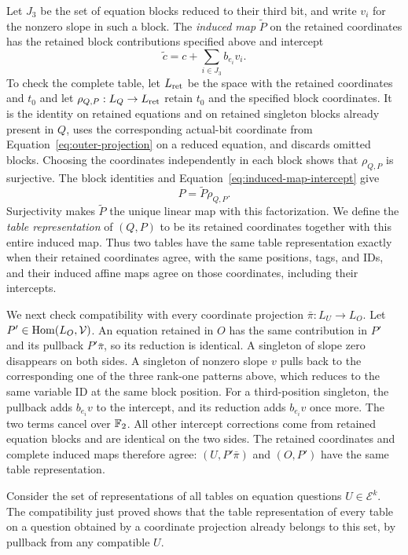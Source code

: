 Let \(J_3\) be the set of equation blocks reduced to their third bit,
and write \(v_i\) for the nonzero slope in such a block.  The
\emph{induced map} \(\widetilde P\) on the retained coordinates has the retained
block contributions specified above and intercept
\begin{equation}
 \widetilde c=c+\sum_{i\in J_3} b_{e_i}v_i.
 \label{eq:induced-map-intercept}
\end{equation}
To check the complete table, let \(L_{\rm ret}\) be the space with the retained coordinates and \(t_0\) and let
\(\rho_{Q,P}:L_Q\to L_{\rm ret}\) retain \(t_0\) and the
specified block coordinates.  It is the identity on retained equations
and on retained singleton blocks already present in \(Q\), uses the
corresponding actual-bit coordinate from
Equation~\eqref{eq:outer-projection} on a reduced equation, and discards
omitted blocks.  Choosing the coordinates independently in each
block shows that \(\rho_{Q,P}\) is surjective.  The block identities
and Equation~\eqref{eq:induced-map-intercept} give
\[
 P=\widetilde P\rho_{Q,P}.
\]
Surjectivity makes \(\widetilde P\) the unique linear map with this
factorization.  We define the \emph{table representation} of \((Q,P)\) to be its
retained coordinates together with this entire induced map.  Thus two tables have
the same table representation exactly when their retained coordinates agree, with the same
positions, tags, and IDs, and their induced affine maps agree on those
coordinates, including their intercepts.

We next check compatibility with every coordinate projection
\(\bar\pi:L_U\to L_O\).  Let
\(P'\in\operatorname{Hom}(L_O,\mathcal V)\).  An equation retained in \(O\)
has the same contribution in \(P'\) and its pullback \(P'\bar\pi\),
so its reduction is identical.  A singleton of slope zero disappears on
both sides.  A singleton of nonzero slope \(v\) pulls back to the
corresponding one of the three rank-one patterns above, which reduces to
the same variable ID at the same block position.  For a third-position
singleton, the pullback adds \(b_{e_i}v\) to the intercept, and its
reduction adds \(b_{e_i}v\) once more.  The two terms cancel over
\(\mathbb F_2\).  All other intercept corrections come from retained equation
blocks and are identical on the two sides.  The retained coordinates and complete
induced maps therefore agree: \((U,P'\bar\pi)\) and \((O,P')\)
have the same table representation.

Consider the set of representations of all tables on equation
questions \(U\in\mathcal E^k\).  The compatibility just proved shows
that the table representation of every table on a question obtained by a coordinate projection already
belongs to this set, by pullback from any compatible \(U\).

